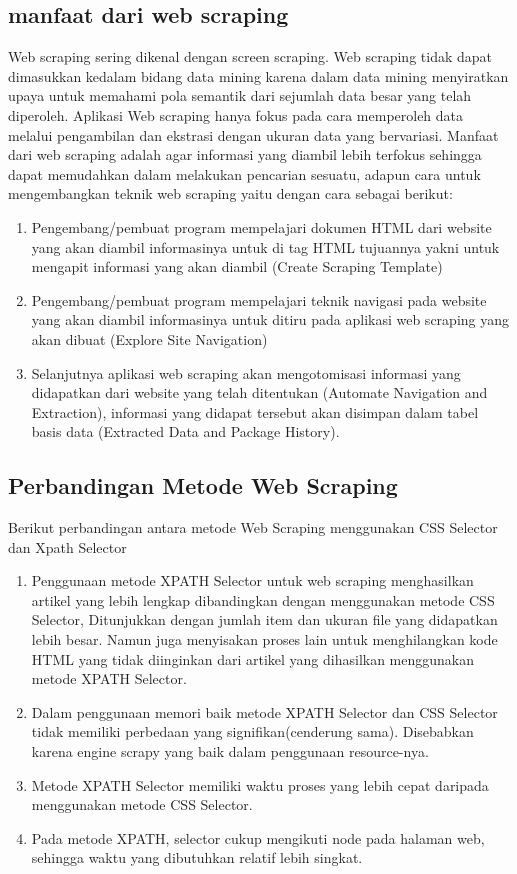 \subsection{manfaat dari web scraping}
Web scraping sering dikenal dengan screen scraping. Web scraping tidak dapat dimasukkan kedalam bidang data
mining karena dalam data mining menyiratkan upaya untuk memahami pola semantik dari sejumlah data besar yang
telah diperoleh. Aplikasi Web scraping hanya fokus pada cara memperoleh data melalui pengambilan dan ekstrasi
dengan ukuran data yang bervariasi. Manfaat dari web scraping adalah agar informasi yang diambil lebih
terfokus sehingga dapat memudahkan dalam melakukan pencarian sesuatu, adapun cara untuk mengembangkan teknik
web scraping yaitu dengan cara sebagai berikut:
\begin{enumerate}
\item Pengembang/pembuat program mempelajari dokumen HTML dari website yang akan diambil informasinya untuk
	  di tag HTML tujuannya yakni untuk mengapit informasi yang akan diambil (Create Scraping Template)
\item Pengembang/pembuat program mempelajari teknik navigasi pada website yang akan diambil informasinya
	   untuk ditiru pada aplikasi web scraping yang akan dibuat (Explore Site Navigation)
\item Selanjutnya aplikasi web scraping akan mengotomisasi informasi yang didapatkan dari website yang telah
	   ditentukan (Automate Navigation and Extraction), informasi yang didapat tersebut akan disimpan dalam 
	   tabel basis data (Extracted Data and Package History).
\end{enumerate}

\subsection{Perbandingan Metode Web Scraping}
Berikut perbandingan antara metode Web Scraping menggunakan CSS Selector dan Xpath Selector
\begin{enumerate}
\item Penggunaan metode XPATH Selector untuk web scraping menghasilkan artikel yang lebih lengkap
	  dibandingkan dengan menggunakan metode CSS Selector, Ditunjukkan dengan jumlah item dan ukuran file
	  yang didapatkan lebih besar. Namun juga menyisakan proses lain untuk menghilangkan kode HTML yang tidak
	  diinginkan dari artikel yang dihasilkan menggunakan metode XPATH Selector.
\item Dalam penggunaan memori baik metode XPATH Selector dan CSS Selector tidak memiliki perbedaan yang
	  signifikan(cenderung sama). Disebabkan karena engine scrapy yang baik dalam penggunaan resource-nya. 
\item Metode XPATH Selector memiliki waktu proses yang lebih cepat daripada menggunakan metode CSS Selector.
\item Pada metode XPATH, selector cukup mengikuti node pada halaman web, sehingga waktu yang dibutuhkan
	  relatif lebih singkat.
\end{enumerate}

